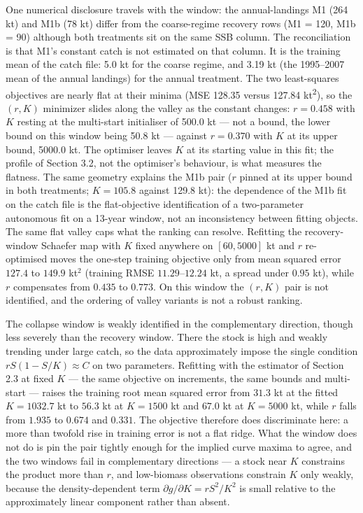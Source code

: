 \documentclass[11pt]{article}
\begin{document}
One numerical disclosure travels with the window: the annual-landings M1
(264 kt) and M1b (78 kt) differ from the coarse-regime recovery rows (M1
= 120, M1b = 90) although both treatments sit on the same SSB column.
The reconciliation is that M1's constant catch is not estimated on that
column. It is the training mean of the catch file: 5.0 kt for the coarse
regime, and 3.19 kt (the 1995--2007 mean of the annual landings) for the
annual treatment. The two least-squares objectives are nearly flat at
their minima (MSE 128.35 versus 127.84 kt\textsuperscript{2}), so the
\((r, K)\) minimizer slides along the valley as the constant changes:
\(r = 0.458\) with \(K\) resting at the multi-start initialiser of
500.0 kt --- not a bound, the lower bound on this window being 50.8 kt
--- against \(r = 0.370\) with \(K\) at its upper bound, 5000.0 kt. The optimiser leaves \(K\) at its starting value in this fit; the
profile of Section 3.2, not the optimiser's behaviour, is what
measures the flatness. The
same geometry explains the M1b pair (\(r\) pinned at its
upper bound in both treatments; \(K = 105.8\) against 129.8 kt): the
dependence of the M1b fit on the catch file is the flat-objective
identification of a two-parameter autonomous fit on a 13-year window,
not an inconsistency between fitting objects. The same flat valley caps what the ranking can resolve. Refitting the
recovery-window Schaefer map with \(K\) fixed anywhere on
\([60, 5000]\) kt and \(r\) re-optimised moves the one-step training
objective only from mean squared error \(127.4\) to \(149.9\) kt\(^2\)
(training RMSE \(11.29\)--\(12.24\) kt, a spread under \(0.95\) kt),
while \(r\) compensates from \(0.435\) to \(0.773\). On this window the
\((r, K)\) pair is not identified, and the ordering of valley variants
is not a robust ranking.

The collapse window is weakly identified in the complementary direction,
though less severely than the recovery window. There the stock is high
and weakly trending under large catch, so the data approximately impose
the single condition \(rS(1-S/K)\approx C\) on two parameters. Refitting
with the estimator of Section 2.3 at fixed \(K\) --- the same objective
on increments, the same bounds and multi-start --- raises the training
root mean squared error from \(31.3\) kt at the fitted
\(K = 1032.7\) kt to \(56.3\) kt at \(K = 1500\) kt and \(67.0\) kt at
\(K = 5000\) kt, while \(r\) falls from \(1.935\) to \(0.674\) and
\(0.331\). The objective therefore does discriminate here: a more than
twofold rise in training error is not a flat ridge. What the window does
not do is pin the pair tightly enough for the implied curve maxima to
agree, and the two windows fail in complementary directions --- a stock
near \(K\) constrains the product more than \(r\), and low-biomass
observations constrain \(K\) only weakly, because the density-dependent
term \(\partial g/\partial K = rS^{2}/K^{2}\) is small relative to the
approximately linear component rather than absent.
\end{document}
